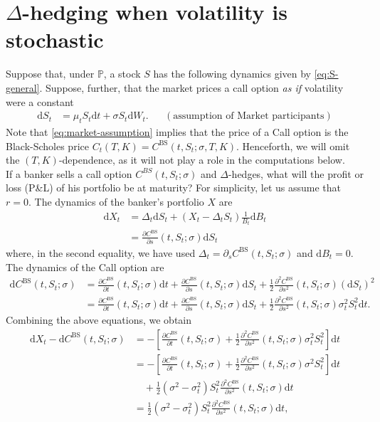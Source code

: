 \documentclass[12pt]{book}
\numberwithin{equation}{chapter}
\theoremstyle{plain}
\numberwithin{theorem}{section}
\theoremstyle{definition}
\numberwithin{exercise}{chapter}
\newcommand{\<}{\langle}
\renewcommand{\>}{\rangle}
\renewcommand{\(}{\left(}
\renewcommand{\)}{\right)}
\renewcommand{\[}{\left[}
\renewcommand{\]}{\right]}
\newcommand\Pb{\mathds{P}}
\newcommand\sig{\sigma}
\newcommand\Del{\Delta}
\renewcommand\d{\partial}
\newcommand\dd{\mathrm{d}}
\newcommand\BS{\textrm{BS}}
\theoremstyle{definition}
\numberwithin{question}{section}
\begin{document}
\section{$\Delta$-hedging when volatility is stochastic}
Suppose that, under $\Pb$, a stock $S$ has the following dynamics given by \eqref{eq:S-general}.
Suppose, further, that the market prices a call option \textit{as if} volatility were a constant
\begin{align}
\dd S_t
	&=	\mu_t S_t \dd t + \sig S_t \dd W_t . &
	&(\text{assumption of Market participants}) \label{eq:market-assumption}
\end{align}
Note that \eqref{eq:market-assumption} implies that the price of a Call option is the Black-Scholes price $C_t(T,K) = C^\BS(t,S_t;\sig,T,K)$.
Henceforth, we will omit the $(T,K)$-dependence, as it will not play a role in the computations below.
\\[0.5em]
If a banker sells a call option $C^{BS}(t,S_t; \sigma)$ and $\Delta$-hedges, what will the profit or loss (P\&L) of his portfolio be at maturity? For simplicity, let us assume that $r=0$.  The dynamics of the banker's portfolio $X$ are
\begin{align}
\dd X_t 
	&= \Delta_t \dd S_t + (X_t - \Delta_t S_t)\frac{1}{B_t} \dd B_t \\
	&=	\frac{\d C^{\text{BS}}}{\d s} (t, S_t;\sigma) \dd S_t 
\end{align}
where, in the second equality, we have used $\Del_t = \d_s C^\BS(t,S_t;\sig)$ and $\dd B_t = 0$.
The dynamics of the Call option are
\begin{align}
\dd C^\BS(t, S_t; \sigma) 
	&= 	\frac{\d C^\BS}{\d t} (t, S_t; \sigma) \dd t + \frac{\d C^\BS}{\d s} (t, S_t; \sigma) \dd S_t 
			+ \frac{1}{2} \frac{\d^2 C^\BS}{\d s^2} (t, S_t; \sigma) ( \dd S_t )^2 \\
	&= 	\frac{\d C^\BS}{\d t} (t, S_t; \sigma) \dd t + \frac{\d C^\BS}{\d s} (t, S_t; \sigma) \dd S_t 
			+ \frac{1}{2} \frac{\d^2 C^\BS}{\d s^2} (t, S_t; \sigma) \sigma^2_t S_t^2  \dd t .
\end{align}
Combining the above equations, we obtain
\begin{align}
\dd X_t -\dd C^\BS(t,S_t;\sig) 
	&= 	- \[  \frac{\d C^\BS}{\d t} (t, S_t; \sigma) + \frac{1}{2} \frac{\d^2 C^\BS}{\d s^2} (t, S_t; \sigma) \sigma^2_t S_t^2 \] \dd t \\
	&= 	- \[  \frac{\d C^\BS}{\d t} (t, S_t; \sigma) + \frac{1}{2} \frac{\d^2 C^\BS}{\d s^2} (t, S_t; \sigma) \sigma^2 S_t^2 \] \dd t \\ &\quad
			+ \frac{1}{2} (\sigma^2 - \sigma^2_t) S_t^2 \frac{\d^2 C^\BS}{\d s^2} (t, S_t; \sigma) \dd t \\
	&=	\frac{1}{2} (\sigma^2 - \sigma^2_t) S_t^2  \frac{\d^2 C^\BS}{\d s^2} (t, S_t; \sigma) \dd t ,
\end{align}
\end{document}
